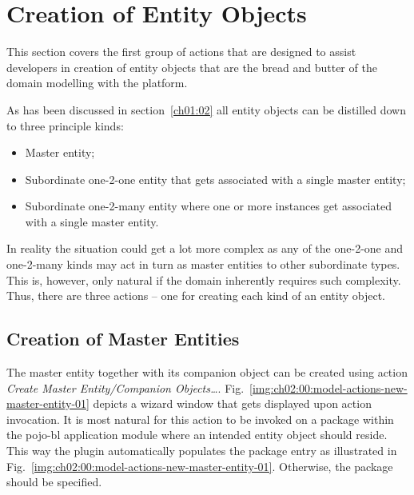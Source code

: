 \section{Creation of Entity Objects}
  
  This section covers the first group of actions that are designed to assist developers in creation of entity objects that are the bread and butter of the domain modelling with the platform.

  As has been discussed in section~\ref{ch01:02} all entity objects can be distilled down to three principle kinds:
  
  \begin{itemize}
   \item Master entity;
   \item Subordinate one-2-one entity that gets associated with a single master entity;
   \item Subordinate one-2-many entity where one or more instances get associated with a single master entity.
  \end{itemize}

  In reality the situation could get a lot more complex as any of the one-2-one and one-2-many kinds may act in turn as master entities to other subordinate types. 
  This is, however, only natural if the domain inherently requires such complexity.  
  Thus, there are three actions -- one for creating each kind of an entity object.
  
  \subsection{Creation of Master Entities}
  
  The master entity together with its companion object can be created using action \emph{Create Master Entity/Companion Objects\ldots}.
  Fig.~\ref{img:ch02:00:model-actions-new-master-entity-01} depicts a wizard window that gets displayed upon action invocation.
  It is most natural for this action to be invoked on a package within the pojo-bl application module where an intended entity object should reside.
  This way the plugin automatically populates the package entry as illustrated in Fig.~\ref{img:ch02:00:model-actions-new-master-entity-01}.
  Otherwise, the package should be specified.
  
